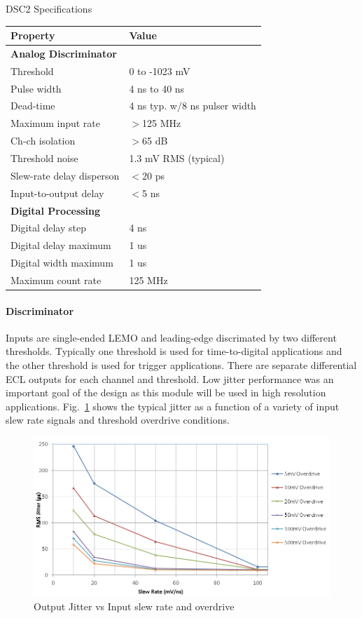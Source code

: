 \begin{center}
	DSC2 Specifications\\
	\begin{tabular}{| l | l |}
		\hline \hline
		Property			& Value				\\
		\hline
		{\bf Analog Discriminator}	&				\\
		Threshold			& 0 to -1023 mV			\\
		Pulse width			& 4 ns to 40 ns			\\
		Dead-time			& 4 ns typ. w/8 ns pulser width	\\
		Maximum input rate		& $>$125 MHz 			\\
		Ch-ch isolation			& $>$65 dB			\\
		Threshold noise			& 1.3 mV RMS (typical)		\\
		Slew-rate delay disperson	& $<$20 ps			\\
		Input-to-output delay		& $<$5 ns			\\
		{\bf Digital Processing}	&				\\
		Digital delay step		& 4 ns				\\
		Digital delay maximum		& 1 us				\\
		Digital width maximum		& 1 us				\\
		Maximum count rate		& 125 MHz			\\
		\hline \hline
	\end{tabular}
\end{center}

\paragraph{Discriminator}
Inputs are single-ended LEMO and leading-edge discrimated by two different thresholds. Typically one threshold is used for time-to-digital applications and the other threshold is used for trigger applications. There are separate differential ECL outputs for each channel and threshold. Low jitter performance was an important goal of the design as this module will be used in high resolution applications. Fig.~\ref{fig:dsc2_jitter} shows the typical jitter as a function of a variety of input slew rate signals and threshold overdrive conditions.

\begin{figure}[hbt]
	\centering
	\includegraphics[width=1.0\columnwidth,keepaspectratio]{img/dsc2_jitter.png}
	\caption{Output Jitter vs Input slew rate and overdrive}
	\label{fig:dsc2_jitter}
\end{figure}


